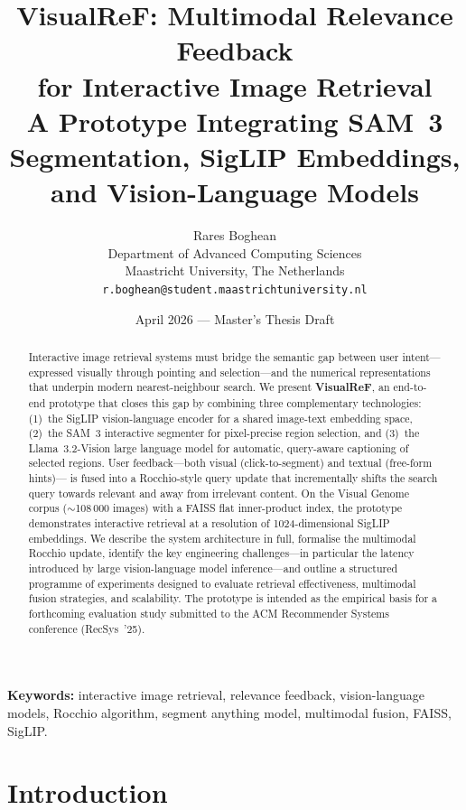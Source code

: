 \documentclass[12pt,a4paper]{article}
\title{%
  \textbf{VisualReF: Multimodal Relevance Feedback\\
  for Interactive Image Retrieval}\\[0.4em]
  \large A Prototype Integrating SAM~3 Segmentation,
  SigLIP Embeddings, and Vision-Language Models
}
\author{%
  Rares Boghean\\[0.2em]
  \small Department of Advanced Computing Sciences\\
  \small Maastricht University, The Netherlands\\
  \small \texttt{r.boghean@student.maastrichtuniversity.nl}
}
\date{April 2026 --- Master's Thesis Draft}
\begin{document}
\maketitle
\thispagestyle{fancy}

\begin{abstract}
\noindent
Interactive image retrieval systems must bridge the semantic gap between
user intent—expressed visually through pointing and selection—and the
numerical representations that underpin modern nearest-neighbour search.
We present \textbf{VisualReF}, an end-to-end prototype that closes this gap
by combining three complementary technologies: (1)~the SigLIP vision-language
encoder for a shared image-text embedding space, (2)~the SAM~3 interactive
segmenter for pixel-precise region selection, and (3)~the Llama~3.2-Vision
large language model for automatic, query-aware captioning of selected regions.
User feedback—both visual (click-to-segment) and textual (free-form hints)—
is fused into a Rocchio-style query update that incrementally shifts the search
query towards relevant and away from irrelevant content.
On the Visual Genome corpus (\(\sim\)108\,000 images) with a FAISS flat
inner-product index, the prototype demonstrates interactive retrieval at a
resolution of 1024-dimensional SigLIP embeddings.
We describe the system architecture in full, formalise the multimodal Rocchio
update, identify the key engineering challenges—in particular the latency
introduced by large vision-language model inference—and outline a structured
programme of experiments designed to evaluate retrieval effectiveness,
multimodal fusion strategies, and scalability.
The prototype is intended as the empirical basis for a forthcoming evaluation
study submitted to the ACM Recommender Systems conference (RecSys~'25).
\end{abstract}

\noindent\textbf{Keywords:} interactive image retrieval, relevance feedback,
vision-language models, Rocchio algorithm, segment anything model,
multimodal fusion, FAISS, SigLIP.

\tableofcontents
\clearpage

\section{Introduction}
\label{sec:introduction}
\end{document}
